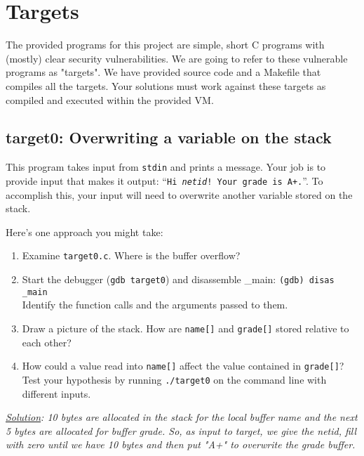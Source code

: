 \documentclass[letterpaper,12pt]{report}
\begin{document}
{%


\section*{Targets}
\label{sec:targets}

The provided programs for this project are simple, short C programs with
(mostly) clear security vulnerabilities. We are going to refer to these
vulnerable programs as "targets". We have provided source code and a Makefile
that compiles all the targets. Your solutions must work against these targets
as compiled and executed within the provided VM.



\subsection*{target0: Overwriting a variable on the stack}
\label{sec:target0}

This program takes input from \texttt{stdin} and prints a message.  Your job is to provide input that makes it output: ``\texttt{Hi \emph{netid}! Your grade is A+.}''.  To accomplish this, your input will need to overwrite another variable stored on the stack.

\smallskip

Here's one approach you might take:
\begin{enumerate}
\item Examine \texttt{target0.c}.  Where is the buffer overflow?
\item Start the debugger (\texttt{gdb target0}) and disassemble \_main: \texttt{(gdb) disas \_main}\\
Identify the function calls and the arguments passed to them.
\item Draw a picture of the stack.  How are \texttt{name[]} and \texttt{grade[]} stored relative to each other?
\item How could a value read into \texttt{name[]} affect the value contained in \texttt{grade[]}?  Test your hypothesis by running \texttt{./target0} on the command line with different inputs.
\end{enumerate}

\textit{\underline{Solution}: 10 bytes are
allocated in the stack for the local buffer name and the next 5 bytes are
allocated for buffer grade. So, as input to target, we give the netid, fill with zero
until we have 10 bytes and then put "A+" to overwrite the grade buffer. }

}
\end{document}
